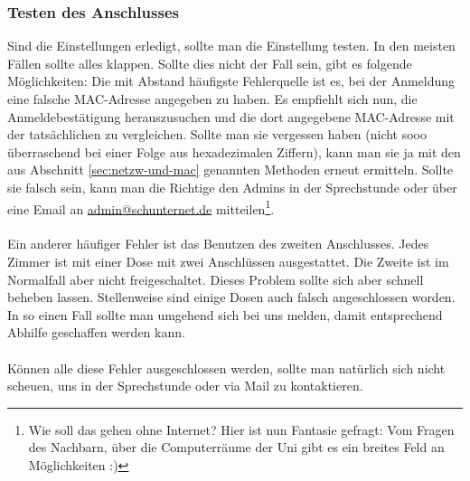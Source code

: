 \subsubsection{Testen des Anschlusses}
Sind die Einstellungen erledigt, sollte man die Einstellung
testen. In den meisten Fällen sollte alles klappen. Sollte dies nicht
der Fall sein, gibt es folgende Möglichkeiten: Die mit Abstand
häufigste Fehlerquelle ist es, bei der Anmeldung eine falsche
MAC-Adresse angegeben zu haben. Es empfiehlt sich nun, die
Anmeldebestätigung herauszusuchen und die dort angegebene MAC-Adresse
mit der tatsächlichen zu vergleichen. Sollte man sie vergessen haben
(nicht sooo überraschend bei einer Folge aus hexadezimalen Ziffern),
kann man sie ja mit den aus Abschnitt \ref{sec:netzw-und-mac}
genannten Methoden erneut ermitteln. Sollte sie falsch sein, kann man
die Richtige den Admins in der Sprechstunde oder über eine Email an
\url{admin@schunternet.de} mitteilen\footnote{Wie soll das gehen ohne
  Internet? Hier ist nun Fantasie gefragt: Vom Fragen des Nachbarn,
  über die Computerräume der Uni gibt es ein breites Feld an
  Möglichkeiten :)}.\\\\
Ein anderer häufiger Fehler ist das Benutzen des zweiten
Anschlusses. Jedes Zimmer ist mit einer Dose mit zwei Anschlüssen
ausgestattet. Die Zweite ist im Normalfall aber nicht
freigeschaltet. Dieses Problem sollte sich aber schnell beheben
lassen. Stellenweise sind einige Dosen auch falsch angeschlossen
worden. In so einen Fall sollte man umgehend sich bei uns melden, 
damit entsprechend Abhilfe geschaffen werden kann.\\\\

Können alle diese Fehler ausgeschlossen werden,  sollte man natürlich sich nicht scheuen, uns in der Sprechstunde oder via Mail zu kontaktieren.
%


